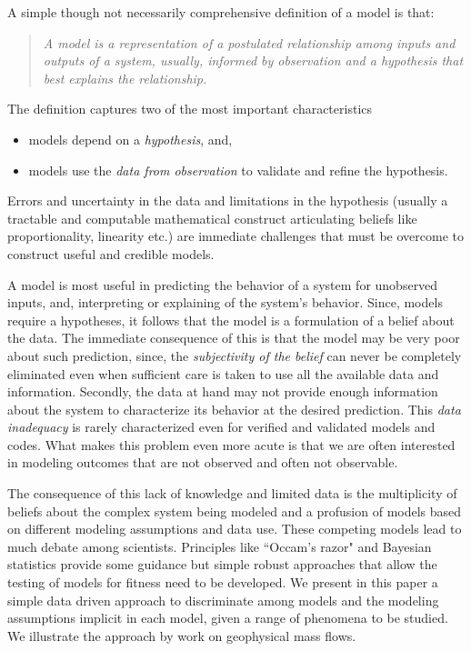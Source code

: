 \documentclass{article}
\begin{document}
A simple though not necessarily comprehensive definition of a model is that: \begin{quote}{\it A model is a representation of a postulated relationship among inputs and outputs of a system, usually, informed by observation and a hypothesis that best explains the relationship.}\end{quote} The definition captures two of the most important characteristics
\begin{itemize}
\item models depend on a {\it hypothesis}, and,
\item models use the {\it data from observation} to validate and refine the hypothesis.
\end{itemize}
Errors and uncertainty in the data and limitations in the hypothesis (usually a tractable and computable mathematical construct articulating beliefs like proportionality, linearity etc.) are immediate challenges that must be overcome to construct useful and credible models.

A model is most useful in predicting the behavior of a system for unobserved inputs, and, interpreting or explaining of the system's behavior. Since, models require a hypotheses, it follows  that the model is a formulation of a belief about the data. The immediate consequence of this is that the model may be very poor about such prediction, since, the {\it subjectivity of the belief} can never be completely eliminated \citep{Kennedy2001, Higdon2004} even when sufficient care is taken to use all the available data and information. Secondly, the data at hand may not provide enough information about the system to characterize its behavior at the desired prediction. This {\it data inadequacy} is rarely characterized even for verified and validated models and codes. What makes this problem even more acute is that we are often interested in modeling outcomes that are not observed and often not observable.

The consequence of this lack of knowledge and limited data is the multiplicity of beliefs about the complex system being modeled and a profusion of models based on different modeling assumptions and data use. These competing models lead to much debate among scientists. Principles like ``Occam's razor" and Bayesian statistics \cite{Farrell2015} provide some guidance but simple robust approaches that allow the testing of models for fitness need to be developed. We present in this paper a simple data driven approach to discriminate among models and the modeling assumptions implicit in each model, given a range of phenomena to be studied. We illustrate the approach by work on geophysical mass flows.
\end{document}
